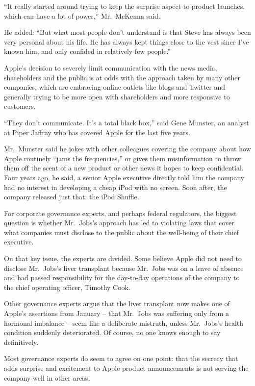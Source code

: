 ﻿\documentclass[12pt,a4paper,onecolumn]{article}
\begin{document}
``It really started around trying to keep the surprise aspect to product launches, which can have a
lot of power,'' Mr.~McKenna said.

He added: ``But what most people don't understand is that Steve has always been very personal about
his life. He has always kept things close to the vest since I've known him, and only confided in
relatively few people.''

Apple's decision to severely limit communication with the news media, shareholders and the public is
at odds with the approach taken by many other companies, which are embracing online outlets like
blogs and Twitter and generally trying to be more open with shareholders and more responsive to
customers.

``They don't communicate. It's a total black box,'' said Gene Munster, an analyst at Piper Jaffray
who has covered Apple for the last five years.

Mr.~Munster said he jokes with other colleagues covering the company about how Apple routinely
``jams the frequencies,'' or gives them misinformation to throw them off the scent of a new product
or other news it hopes to keep confidential. Four years ago, he said, a senior Apple executive
directly told him the company had no interest in developing a cheap iPod with no screen. Soon after,
the company released just that: the iPod Shuffle.

For corporate governance experts, and perhaps federal regulators, the biggest question is whether
Mr.~Jobs's approach has led to violating laws that cover what companies must disclose to the public
about the well-being of their chief executive.

On that key issue, the experts are divided. Some believe Apple did not need to disclose Mr.~Jobs's
liver transplant because Mr.~Jobs was on a leave of absence and had passed responsibility for the
day-to-day operations of the company to the chief operating officer, Timothy Cook.

Other governance experts argue that the liver transplant now makes one of Apple's assertions from
January -- that Mr.~Jobs was suffering only from a hormonal imbalance -- seem like a deliberate
mistruth, unless Mr.~Jobs's health condition suddenly deteriorated. Of course, no one knows enough
to say definitively.

Most governance experts do seem to agree on one point: that the secrecy that adds surprise and
excitement to Apple product announcements is not serving the company well in other areas.
\end{document}
